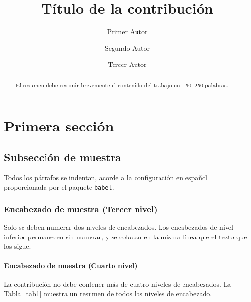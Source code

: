 \documentclass{sistedes}
\begin{document}
%
\title{Título de la contribución}
%
%
\author{Primer Autor \and
Segundo Autor \and
Tercer Autor}
%
%

%
\maketitle              %
%
\begin{abstract}
El resumen debe resumir brevemente el contenido del trabajo en~150--250 palabras.

\end{abstract}
%
%
%
\section{Primera sección}
\subsection{Subsección de muestra}
Todos los párrafos se indentan, acorde a la configuración en español 
proporcionada por el paquete \verb|babel|.

\subsubsection{Encabezado de muestra (Tercer nivel)}
Solo se deben numerar dos niveles de encabezados. Los encabezados de nivel
inferior permanecen sin numerar; y se colocan en la misma línea que el texto
que los sigue.

\paragraph{Encabezado de muestra (Cuarto nivel)}
La contribución no debe contener más de cuatro niveles de encabezados.
La Tabla~\ref{tab1} muestra un resumen de todos los niveles de encabezado.
\end{document}
